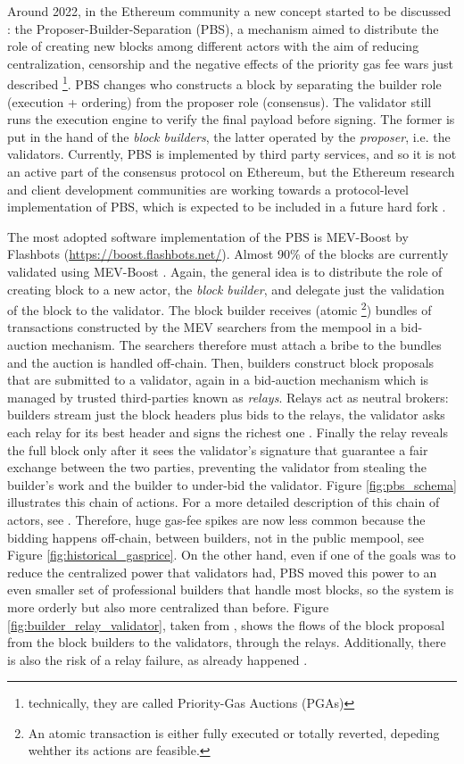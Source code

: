 \documentclass[a4paper,11pt]{article}
\begin{document}
Around 2022, in the Ethereum community a new concept started to be discussed \cite{buterinPBS2021}: the Proposer-Builder-Separation (PBS), a mechanism aimed to distribute the role of creating new blocks among different actors with the aim of reducing centralization, censorship and the negative effects of the priority gas fee wars just described \footnote{technically, they are called Priority-Gas Auctions (PGAs)}. PBS changes who constructs a block by separating the builder role (execution + ordering) from the proposer role (consensus). The validator still runs the execution engine to verify the final payload before signing. The former is put in the hand of the \textit{block builders}, the latter operated by the \textit{proposer}, i.e. the validators. Currently, PBS is implemented by third party services, and so it is not an active part of the consensus protocol on Ethereum, but the Ethereum research and client development communities are working towards a protocol-level implementation of PBS, which is expected to be included in a future hard fork \cite{ethereumPBS2024}.

The most adopted software implementation of the PBS is MEV-Boost by Flashbots (\url{https://boost.flashbots.net/}). Almost 90\% of the blocks are currently validated using MEV-Boost \cite{mevboost_pics}. Again, the general idea is to distribute the role of creating block to a new actor, the \textit{block builder}, and delegate just the validation of the block to the validator. The block builder receives (atomic \footnote{An atomic transaction is either fully executed or totally reverted, depeding wehther its actions are feasible.}) bundles of transactions constructed by the MEV searchers from the mempool in a bid-auction mechanism. The searchers therefore must attach a bribe to the bundles and the auction is handled off-chain. Then, builders construct block proposals that are submitted to a validator, again in a bid-auction mechanism which is managed by trusted third-parties known as \textit{relays}. Relays act as neutral brokers: builders stream just the block headers plus bids to the relays, the validator asks each relay for its best header and signs the richest one . Finally the relay reveals the full block only after it sees the validator’s signature that guarantee a fair exchange between the two parties, preventing the validator from stealing the builder’s work and the builder to under-bid the validator. Figure \ref{fig:pbs_schema} illustrates this chain of actions. For a more detailed description of this chain of actors, see \cite{oz2024wins}. Therefore, huge gas-fee spikes are now less common because the bidding happens off-chain, between builders, not in the public mempool, see Figure \ref{fig:historical_gasprice}. On the other hand, even if one of the goals was to reduce the centralized power that validators had, PBS moved this power to an even smaller set of professional builders that handle most blocks, so the system is more orderly but also more centralized than before. Figure \ref{fig:builder_relay_validator}, taken from \cite{mevboost_pics}, shows the flows of the block proposal from the block builders to the validators, through the relays. Additionally, there is also the risk of a relay failure, as already happened \cite{marzecThibault2024} \cite{damatoNeuder2023}.
\end{document}
